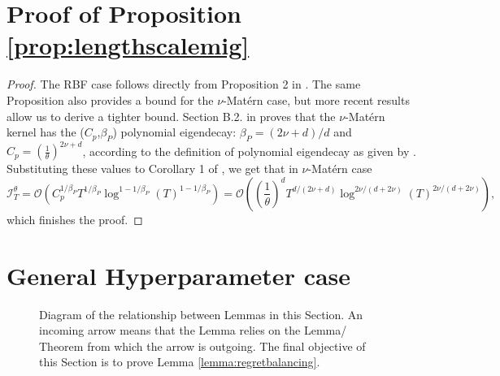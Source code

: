 \documentclass{article}
\theoremstyle{plain}
\theoremstyle{definition}
\theoremstyle{remark}
\theoremstyle{plain}
\begin{document}






\newpage
\appendix
\section{Proof of Proposition \ref{prop:lengthscalemig}} \label{app:lengthscalemigproof}
\lengthscalemig*
\begin{proof}
    The RBF case follows directly from Proposition 2 in \cite{berkenkamp2019no}. The same Proposition also provides a bound for the $\nu$-Matérn case, but more recent results allow us to derive a tighter bound. Section B.2. in \cite{berkenkamp2019no} proves that the $\nu$-Matérn kernel has the ($C_p$,$\beta_P$) polynomial eigendecay:
    $\beta_P = (2\nu + d) / d$ and $C_p = \left(\frac{1}{\theta}\right)^{2\nu + d}$, according to the definition of polynomial eigendecay as given by \cite{vakili2021information}. Substituting these values to Corollary 1 of \cite{vakili2021information}, we get that in $\nu$-Matérn case 
    $$\mathcal{I}_T^\theta  = \mathcal{O}\left( C_p^{1/\beta_P}T^{1/\beta_P}\log^{1 - 1/\beta_P}(T)^{1 - 1/\beta_P}\right) = \mathcal{O}\left( \left(\frac{1}{\theta}\right)^{d}T^{d/(2\nu +d)}\log^{2\nu/(d + 2\nu)}(T)^{2\nu/(d + 2\nu)}\right) ,$$
    which finishes the proof.
\end{proof}

\section{General Hyperparameter case}
\begin{figure}[h]
    \centering
    \caption{Diagram of the relationship between Lemmas in this Section. An incoming arrow means that the Lemma relies on the Lemma/ Theorem from which the arrow is outgoing. The final objective of this Section is to prove Lemma \ref{lemma:regretbalancing}.}
    \label{fig:proofstrategy}
\end{figure}
\end{document}
